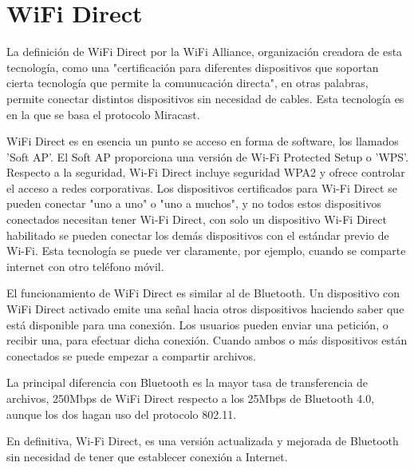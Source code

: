\section{WiFi Direct}

La definición de WiFi Direct por la WiFi Alliance, organización creadora de esta tecnología, como una "certificación para diferentes dispositivos que soportan cierta tecnología que permite la comunucación directa", en otras palabras, permite conectar distintos dispositivos sin necesidad de cables. Esta tecnología es en la que se basa el protocolo Miracast.

WiFi Direct es en esencia un punto se acceso en forma de software, los llamados 'Soft AP'. El Soft AP proporciona una versión de Wi-Fi Protected Setup o 'WPS'. Respecto a la seguridad, Wi-Fi Direct incluye seguridad WPA2 y ofrece controlar el acceso a redes corporativas. Los dispositivos certificados para Wi-Fi Direct se pueden conectar "uno a uno" o "uno a muchos", y no todos estos dispositivos conectados necesitan tener Wi-Fi Direct, con solo un dispositivo Wi-Fi Direct habilitado se pueden conectar los demás dispositivos con el estándar previo de Wi-Fi. Esta tecnología se puede ver claramente, por ejemplo, cuando se comparte internet con otro teléfono móvil.

El funcionamiento de WiFi Direct es similar al de Bluetooth. Un dispositivo con  WiFi Direct activado emite una señal hacia otros dispositivos haciendo saber que está disponible para una conexión. Los usuarios pueden enviar una petición, o recibir una, para efectuar dicha conexión. Cuando ambos o más dispositivos están conectados se puede empezar a compartir archivos.

La principal diferencia con Bluetooth es la mayor tasa de transferencia de archivos, 250Mbps de WiFi Direct respecto a los 25Mbps de Bluetooth 4.0, aunque los dos hagan uso del protocolo 802.11.

En definitiva, Wi-Fi Direct, es una versión actualizada y mejorada de Bluetooth sin necesidad de tener que establecer conexión a Internet.
